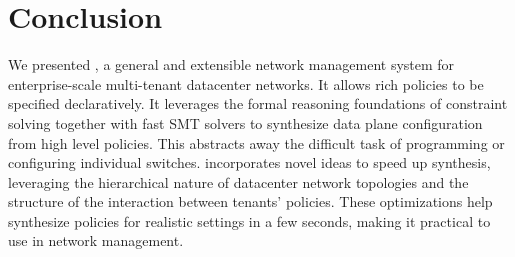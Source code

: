 \section{Conclusion}

We presented \Name, a general and extensible network management system
for enterprise-scale multi-tenant datacenter networks. It allows
rich policies to be specified declaratively. It leverages
the formal reasoning foundations of constraint solving together with
fast SMT solvers to synthesize data plane configuration from high
level policies. This abstracts away the difficult task of programming or
configuring individual switches. \Name incorporates novel ideas to
speed up synthesis, leveraging the hierarchical nature of datacenter
network topologies and the structure of the interaction between
tenants' policies. These optimizations help \Name synthesize policies
for realistic settings in a few seconds, making it practical to use in
network management.

